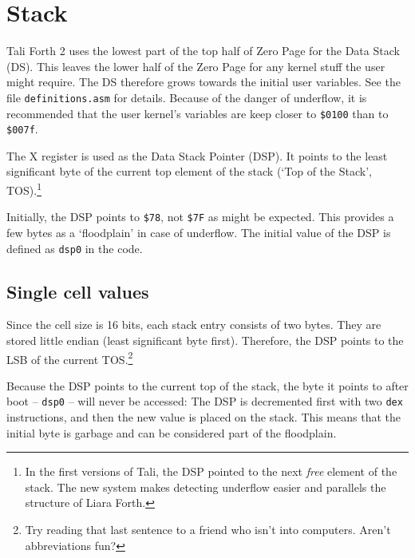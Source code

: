 \section{Stack}

Tali Forth 2 uses the lowest part of the top half of Zero Page
for the Data Stack (DS). This leaves the lower half of the Zero Page for any
kernel stuff the user might require. The DS therefore grows towards the initial
user variables. See the file \texttt{definitions.asm} for details.  Because of
the danger of underflow, it is recommended that the user
kernel's variables are keep closer to \texttt{\$0100} than to \texttt{\$007f}.

The X register is used as the Data Stack Pointer (DSP). It
points to the least significant byte of the current top element of the stack
(`Top of the Stack', TOS).\footnote{In the first versions of Tali, the DSP pointed to the next \textit{free} element of the stack. The
new system makes detecting underflow easier and parallels the structure of Liara
Forth.}

Initially, the DSP points to \texttt{\$78}, not \texttt{\$7F} as might be
expected. This provides a few bytes as a `floodplain'
in case of underflow. The initial value of the DSP is defined
as \texttt{dsp0} in the code.

\subsection{Single cell values} Since the cell size is 16 bits, each stack entry
consists of two bytes. They are stored little endian (least
significant byte first). Therefore, the DSP points to the LSB of the current
TOS.\footnote{Try reading that last sentence to a friend who isn't into
computers. Aren't abbreviations fun?}

Because the DSP points to the current top of the stack, the byte it points to
after boot -- \texttt{dsp0} -- will never be accessed: The DSP is decremented first with
two \texttt{dex} instructions, and then the new value is placed on the stack. This
means that the initial byte is garbage and can be considered part of the floodplain. 

